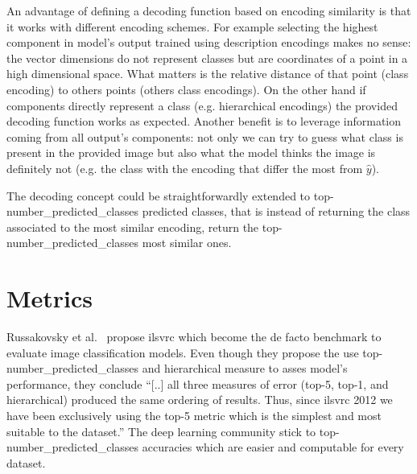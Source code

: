 An advantage of defining a decoding function based on encoding similarity
is that it works with different encoding schemes. For example selecting the
highest component in model's output trained using description encodings makes no
sense: the vector dimensions do not represent classes but are coordinates of a
point in a high dimensional space. What matters is the relative distance of that
point (class encoding) to others points (others class encodings). On the other
hand if components directly represent a class (e.g. hierarchical encodings) the
provided decoding function works as expected.
Another benefit is to leverage information coming from all output's components:
not only we can try to guess what class is present in the provided image but
also what the model thinks the image is definitely not (e.g. the class with the
encoding that differ the most from $\hat{y}$).\medskip

The decoding concept could be straightforwardly extended to
top-\gls{number_predicted_classes} predicted classes, that is instead of
returning the class associated to the most similar encoding, return the
top-\gls{number_predicted_classes} most similar ones.



\section{Metrics}
\label{sec:metrics}
Russakovsky et al.~\cite{ImagenetLargeRussak2014} propose \acrfull{ilsvrc} which
become the de facto benchmark to evaluate image classification models. Even
though they propose the use top-\gls{number_predicted_classes} and hierarchical
measure to asses model's performance, they conclude ``[..] all three measures of
error (top-5, top-1, and hierarchical) produced the same ordering of results.
Thus, since \acrshort{ilsvrc} 2012 we have been exclusively using the top-5
metric which is the simplest and most suitable to the dataset.'' The deep
learning community stick to top-\gls{number_predicted_classes} accuracies which
are easier and computable for every dataset.

